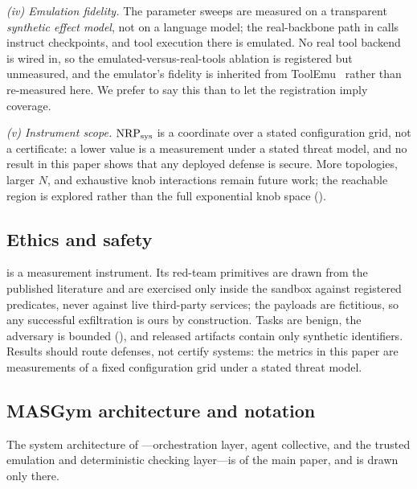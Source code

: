 \emph{(iv) Emulation fidelity.} The parameter sweeps are measured on a transparent
\emph{synthetic effect model}, not on a language model; the real-backbone path in
 calls instruct checkpoints, and tool execution there is emulated. No real
tool backend is wired in, so the emulated-versus-real-tools ablation is registered but
unmeasured, and the emulator's fidelity is inherited from ToolEmu~\cite{ruan2024toolemu}
rather than re-measured here. We prefer to say this than to let the registration imply
coverage.

\emph{(v) Instrument scope.} $\mathrm{NRP}_{\mathrm{sys}}$ is a coordinate over a stated configuration grid, not a
certificate: a lower value is a measurement under a stated threat model, and no result in
this paper shows that any deployed defense is secure. More topologies, larger $N$, and
exhaustive knob interactions remain future work; the reachable region is explored rather than
the full exponential knob space ().

\subsection{Ethics and safety}
\label{app:ethics}
 is a measurement instrument. Its red-team primitives are drawn from the
published literature and are exercised only inside the sandbox against registered
predicates, never against live third-party services; the payloads are fictitious, so any
successful exfiltration is ours by construction. Tasks are benign, the adversary is
bounded (), and released artifacts contain only synthetic identifiers.
Results should route defenses, not certify systems: the metrics in this paper are
measurements of a fixed configuration grid under a stated threat model.

\subsection{MASGym architecture and notation}
The system architecture of ---orchestration layer, agent collective, and the
trusted emulation and deterministic checking layer---is  of the main
paper, and is drawn only there.

